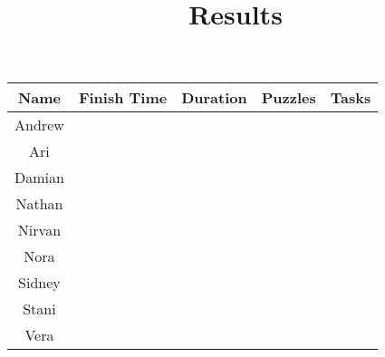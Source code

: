 \documentclass{article}
\begin{document}
\title{Results}
\maketitle

\begin{center}
\begin{tabular} { | c || c | c | c | c | }
\hline
\textbf{  Name  } & \textbf{  Finish Time  } & \textbf{  Duration  } & \textbf{  Puzzles  } & \textbf{  Tasks  } \\ \hline
Andrew & & & & \\ \hline
Ari & & & & \\ \hline
Damian & & & & \\ \hline
Nathan & & & & \\ \hline
Nirvan & & & & \\ \hline
Nora & & & & \\ \hline
Sidney & & & & \\ \hline
Stani & & & & \\ \hline
Vera & & & & \\
\hline
\end{tabular}
\end{center}
\end{document}
